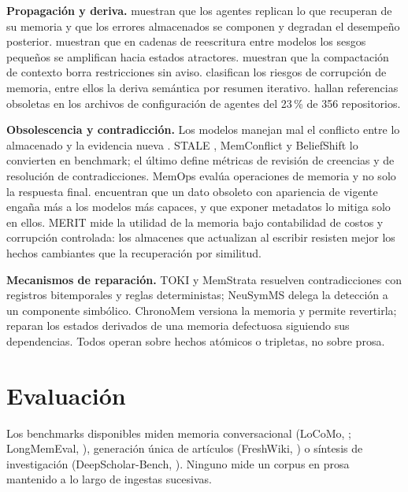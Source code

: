 \documentclass[11pt,letterpaper]{article}
\begin{document}
\textbf{Propagación y deriva.} \citet{xiong2025} muestran que los agentes replican lo que recuperan de su memoria y que los errores almacenados se componen y degradan el desempeño posterior. \citet{perez2024} muestran que en cadenas de reescritura entre modelos los sesgos pequeños se amplifican hacia estados atractores. \citet{chen2026} muestran que la compactación de contexto borra restricciones sin aviso. \citet{lam2026} clasifican los riesgos de corrupción de memoria, entre ellos la deriva semántica por resumen iterativo. \citet{treude2026} hallan referencias obsoletas en los archivos de configuración de agentes del 23\,\% de 356 repositorios.

\textbf{Obsolescencia y contradicción.} Los modelos manejan mal el conflicto entre lo almacenado y la evidencia nueva \citep{xu2024conflicts,hase2024}. STALE \citep{chao2026}, MemConflict \citep{tao2026} y BeliefShift \citep{myakala2026} lo convierten en benchmark; el último define métricas de revisión de creencias y de resolución de contradicciones. MemOps \citep{hao2026} evalúa operaciones de memoria y no solo la respuesta final. \citet{hu2026trust} encuentran que un dato obsoleto con apariencia de vigente engaña más a los modelos más capaces, y que exponer metadatos lo mitiga solo en ellos. MERIT \citep{mishra2026} mide la utilidad de la memoria bajo contabilidad de costos y corrupción controlada: los almacenes que actualizan al escribir resisten mejor los hechos cambiantes que la recuperación por similitud.

\textbf{Mecanismos de reparación.} TOKI \citep{wang2026toki} y MemStrata \citep{yadav2026} resuelven contradicciones con registros bitemporales y reglas deterministas; NeuSymMS \citep{sultan2026} delega la detección a un componente simbólico. ChronoMem \citep{su2026} versiona la memoria y permite revertirla; \citet{yu2026} reparan los estados derivados de una memoria defectuosa siguiendo sus dependencias. Todos operan sobre hechos atómicos o tripletas, no sobre prosa.

\section{Evaluación}

Los benchmarks disponibles miden memoria conversacional (LoCoMo, \citealp{maharana2024}; LongMemEval, \citealp{wu2024}), generación única de artículos (FreshWiki, \citealp{shao2024}) o síntesis de investigación (DeepScholar-Bench, \citealp{patel2025}). Ninguno mide un corpus en prosa mantenido a lo largo de ingestas sucesivas.
\end{document}
